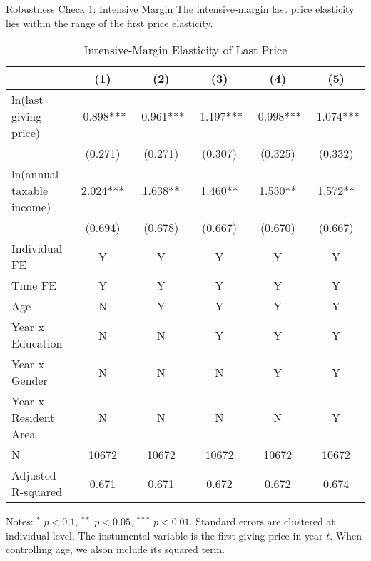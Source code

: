 \documentclass[
  ignorenonframetext,
  aspectratio=169,
]{beamer}
\begin{document}
\begin{frame}{Robustness Check 1: Intensive Margin}
\protect\hypertarget{robustness-check-1-intensive-margin}{}
The intensive-margin last price elasticity lies within the range of the first price elasticity.

\begin{table}

\caption{\label{tab:LastIntensive}Intensive-Margin Elasticity of Last Price}
\centering
\fontsize{7}{9}\selectfont
\begin{threeparttable}
\begin{tabular}[t]{lccccc}
\toprule
 & (1) & (2) & (3) & (4) & (5)\\
\midrule
ln(last giving price) & -0.898*** & -0.961*** & -1.197*** & -0.998*** & -1.074***\\
 & (0.271) & (0.271) & (0.307) & (0.325) & (0.332)\\
ln(annual taxable income) & 2.024*** & 1.638** & 1.460** & 1.530** & 1.572**\\
 & (0.694) & (0.678) & (0.667) & (0.670) & (0.667)\\
Individual FE & Y & Y & Y & Y & Y\\
Time FE & Y & Y & Y & Y & Y\\
Age & N & Y & Y & Y & Y\\
Year x Education & N & N & Y & Y & Y\\
Year x Gender & N & N & N & Y & Y\\
Year x Resident Area & N & N & N & N & Y\\
N & 10672 & 10672 & 10672 & 10672 & 10672\\
Adjusted R-squared & 0.671 & 0.671 & 0.672 & 0.672 & 0.674\\
\bottomrule
\end{tabular}
\begin{tablenotes}
\item Notes: $^{*}$ $p < 0.1$, $^{**}$ $p < 0.05$, $^{***}$ $p < 0.01$. Standard errors are clustered at individual level. The instumental variable is the first giving price in year $t$. When controlling age, we alson include its squared term.
\end{tablenotes}
\end{threeparttable}
\end{table}
\end{frame}
\end{document}

